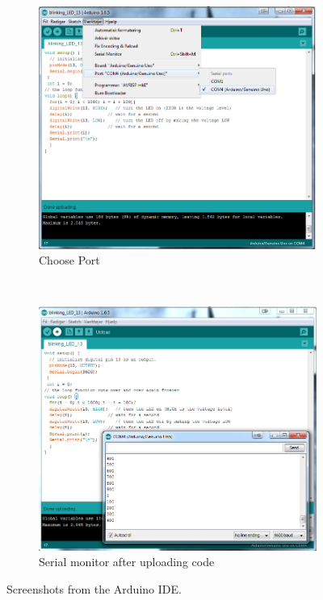 \begin{figure}[!ht]
\begin{subfigure}{0.47\linewidth}
        \includegraphics[width=\linewidth]{Figures/ChoosePort.png}
        \caption{Choose Port}
        \label{fig:choose_port}
    \end{subfigure}\\[1ex]
    \begin{subfigure}{\linewidth}
        \centering
        \includegraphics[width=0.47\linewidth]{Figures/SerialMonitor}
        \caption{Serial monitor after uploading code}
        \label{fig:serial_monitor}
    \end{subfigure}
    \caption{Screenshots from the Arduino IDE.}
    \label{fig:ArduinoScreenshots}
\end{figure}
